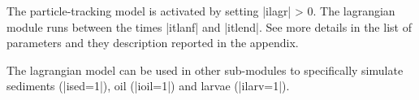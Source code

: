 The particle-tracking model is activated by setting |ilagr| > 0.
The lagrangian module runs between the times |itlanf| and |itlend|.
See more details in the list of parameters and they description 
reported in the appendix.

The lagrangian model can be used in other sub-modules to specifically
simulate sediments (|ised=1|), oil (|ioil=1|) and larvae (|ilarv=1|).


